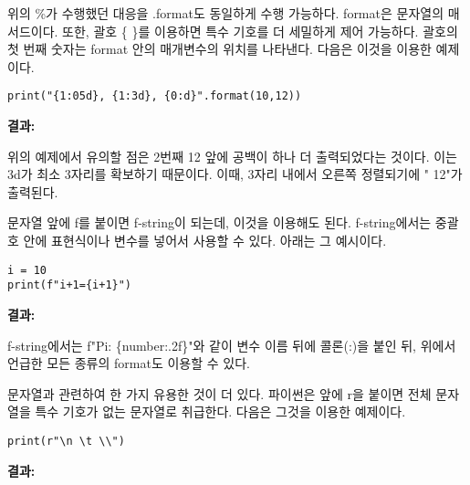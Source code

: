 위의 \%가 수행했던 대응을 .format도 동일하게 수행 가능하다. format은 문자열의 매서드이다. 또한, 괄호 \{ \}를 이용하면 특수 기호를 더 세밀하게 제어 가능하다. 괄호의 첫 번째 숫자는 format 안의 매개변수의 위치를 나타낸다. 다음은 이것을 이용한 예제이다.

\begin{minipage}{\textwidth}
\begin{tcolorbox}[colframe=black, colback=white]
\begin{verbatim}
print("{1:05d}, {1:3d}, {0:d}".format(10,12))
\end{verbatim}
\end{tcolorbox}
\textbf{결과: }
\end{minipage}

위의 예제에서 유의할 점은 2번째 12 앞에 공백이 하나 더 출력되었다는 것이다. 이는 3d가 최소 3자리를 확보하기 때문이다. 이때, 3자리 내에서 오른쪽 정렬되기에 " 12"가 출력된다.

문자열 앞에 f를 붙이면 f-string이 되는데, 이것을 이용해도 된다. f-string에서는 중괄호 안에 표현식이나 변수를 넣어서 사용할 수 있다. 아래는 그 예시이다.

\begin{minipage}{\textwidth}
\begin{tcolorbox}[colframe=black, colback=white]
\begin{verbatim}
i = 10
print(f"i+1={i+1}")
\end{verbatim}
\end{tcolorbox}
\textbf{결과: }
\end{minipage}

f-string에서는 f"Pi: \{number:.2f\}"와 같이 변수 이름 뒤에 콜론(:)을 붙인 뒤, 위에서 언급한 모든 종류의 format도 이용할 수 있다.

문자열과 관련하여 한 가지 유용한 것이 더 있다. 파이썬은 앞에 r을 붙이면 전체 문자열을 특수 기호가 없는 문자열로 취급한다. 다음은 그것을 이용한 예제이다.

\begin{minipage}{\textwidth}
\begin{tcolorbox}[colframe=black, colback=white]
\begin{verbatim}
print(r"\n \t \\")
\end{verbatim}
\end{tcolorbox}
\textbf{결과: }
\end{minipage}

